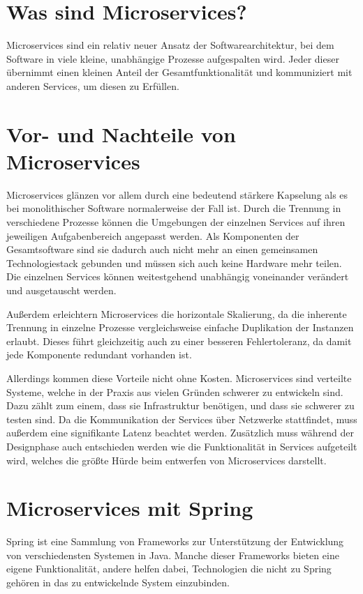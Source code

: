 \documentclass{article}
\begin{document}
\section{Was sind Microservices?}

Microservices sind ein relativ neuer Ansatz der Softwarearchitektur, bei dem Software in viele kleine, unabhängige Prozesse aufgespalten wird\cite{OMA}.
Jeder dieser übernimmt einen kleinen Anteil der Gesamtfunktionalität und kommuniziert mit anderen Services, um diesen zu Erfüllen\cite{EMMA}.

\section{Vor- und Nachteile von Microservices}

Microservices glänzen vor allem durch eine bedeutend stärkere Kapselung als es bei monolithischer Software normalerweise der Fall ist.
Durch die Trennung in verschiedene Prozesse können die Umgebungen der einzelnen Services auf ihren jeweiligen Aufgabenbereich angepasst werden.
Als Komponenten der Gesamtsoftware sind sie dadurch auch nicht mehr an einen gemeinsamen Technologiestack gebunden und müssen sich auch keine Hardware mehr teilen.
Die einzelnen Services können weitestgehend unabhängig voneinander verändert und ausgetauscht werden.

Außerdem erleichtern Microservices die horizontale Skalierung, da die inherente Trennung in einzelne Prozesse vergleichsweise einfache Duplikation der Instanzen erlaubt.
Dieses führt gleichzeitig auch zu einer besseren Fehlertoleranz, da damit jede Komponente redundant vorhanden ist.

Allerdings kommen diese Vorteile nicht ohne Kosten.
Microservices sind verteilte Systeme, welche in der Praxis aus vielen Gründen schwerer zu entwickeln sind.
Dazu zählt zum einem, dass sie Infrastruktur benötigen, und dass sie schwerer zu testen sind.
Da die Kommunikation der Services über Netzwerke stattfindet, muss außerdem eine signifikante Latenz beachtet werden.
Zusätzlich muss während der Designphase auch entschieden werden wie die Funktionalität in Services aufgeteilt wird, welches die größte Hürde beim entwerfen von Microservices darstellt.\cite{OMA}

\section{Microservices mit Spring}

Spring ist eine Sammlung von Frameworks zur Unterstützung der Entwicklung von verschiedensten Systemen in Java.
Manche dieser Frameworks bieten eine eigene Funktionalität, andere helfen dabei, Technologien die nicht zu Spring gehören in das zu entwickelnde System einzubinden.
\end{document}
